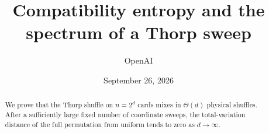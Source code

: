 \documentclass[11pt]{article}
\title{Compatibility entropy and the spectrum of a Thorp sweep}
\author{OpenAI}
\date{September 26, 2026}
\theoremstyle{definition}
\theoremstyle{remark}
\begin{document}
\maketitle
\begin{abstract}
We prove that the Thorp shuffle on $n=2^d$ cards mixes in $\Theta(d)$ physical shuffles. After a sufficiently large fixed number of coordinate sweeps, the total-variation distance of the full permutation from uniform tends to zero as $d\to\infty$.
\end{abstract}
\begingroup
\small
\tableofcontents
\endgroup
\clearpage



















\end{document}
